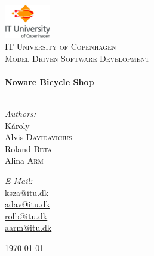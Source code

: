 
\begin{titlepage}

\begin{center}


\includegraphics[width=0.15\textwidth]{./itu_logo}\\[1cm]    

\textsc{\LARGE IT University of Copenhagen}\\[1.5cm]

\textsc{\Large Model Driven Software Development}\\[0.5cm]

\HRule \\[0.4cm]
{ \huge \bfseries Noware Bicycle Shop}\\[0.4cm]

\HRule \\[1.5cm]

\begin{minipage}{0.4\textwidth}
\begin{flushleft} \large
\emph{Authors:}\\
K\'aroly \\
Alvis \textsc{Davidavicius}\\
Roland \textsc{Beta}\\
Alina \textsc{Arm}\\
\end{flushleft}
\end{minipage}
\begin{minipage}{0.4\textwidth}
\begin{flushright} \large
\emph{E-Mail:} \\
\href{mailto:ksza@itu.dk}{ksza@itu.dk}\\
\href{mailto:adav@itu.dk}{adav@itu.dk}\\
\href{mailto:rolb@itu.dk}{rolb@itu.dk}\\
\href{mailto:aarm@itu.dk}{aarm@itu.dk}\\
\end{flushright}
\end{minipage}

\vfill

{\large \today}

\end{center}

\end{titlepage}